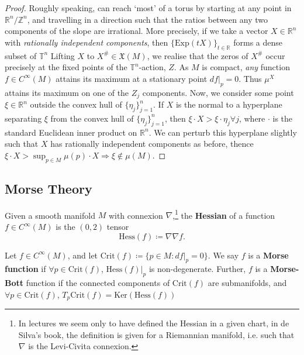 \documentclass[11pt, final]{article}
\begin{document}
\begin{proof}
	Roughly speaking, can reach `most' of a torus by starting at any point in $ \mathbb{R}^{n}/\mathbb{Z}^{n} $, and travelling in a direction such that the ratios between any two components of the slope are irrational. More precisely, if we take a vector $ X \in \mathbb{R}^n  $ with \textit{rationally independent components}, then $\{ \mathrm{Exp}(tX) \}_{t \in \mathbb{R}} $ forms a dense subset of $ \mathbb{T}^n $ Lifting $ X $ to $ X^\# \in \mathfrak{X}(M) $, we realise that the zeros of $ X^\# $ occur precisely at the fixed points of the $ \mathbb{T}^n $-action, $ Z $. As $ M $ is compact, \textit{any} function  $ f \in C^\infty(M) $ attains its maximum at a stationary point $ df|_p = 0 $. Thus $ \mu^X $ attains its maximum on one of the $ Z_j $ components. Now, we consider some point $ \xi \in \mathbb{R}^n $ outside the convex hull of $ \{\eta_j\}_{j=1}^n$. If $ X $ is the normal to a hyperplane separating $ \xi $ from the convex hull of $ \{ \eta_j \}_{j=1}^n $, then $ \xi \cdot X > \xi \cdot \eta_j \forall j $, where $ \cdot $ is the standard Euclidean inner product on $ \mathbb{R}^n $. We can perturb this hyperplane slightly such that $ X $ has rationally independent components as before, thence $ \xi \cdot X > \sup_{p \in M} \mu(p) \cdot X \Rightarrow \xi \notin \mu(M) $.
	
\end{proof}

\subsection{Morse Theory}

\begin{definition}[Hessian]
	Given a smooth manifold $ M $ with connexion $ \nabla $,\footnote{In lectures we seem only to have defined the Hessian in a given chart, in de Silva's book, the definition is given for a Riemannian manifold, i.e. such that $ \nabla $ is the Levi-Civita connexion.} the \textbf{Hessian} of a function $ f \in C^\infty(M) $ is the $ (0,2) $ tensor
		\begin{equation*}
		\mathrm{Hess}(f) \coloneqq \nabla \nabla f.
		\end{equation*}
\end{definition}

\begin{definition}
	Let $ f \in C^\infty(M) $, and let $ \mathrm{Crit} (f) \coloneqq \{ p \in M : df|_p = 0 \} $. We say $ f $ is a \textbf{Morse function} if $ \forall p \in \mathrm{Crit} (f) $, $ \mathrm{Hess} (f)|_p $ is non-degenerate. Further, $ f $ is a \textbf{Morse-Bott} function if the connected components of $ \mathrm{Crit} (f) $ are submanifolds, and $ \forall p \in \mathrm{Crit} (f) $, $ T_p\mathrm{Crit} (f) = \mathrm{Ker} \left( \mathrm{Hess} (f) \right) $
\end{definition}
\end{document}
